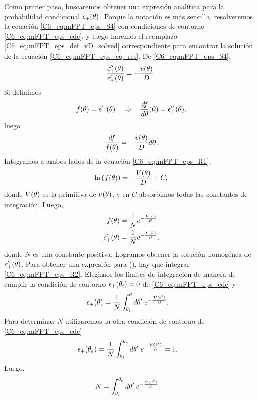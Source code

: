 \documentclass[./main.tex]{subfiles}
\begin{document}
Como primer paso, buscaremos obtener una expresión analítica para la probabilidad condicional $\epsilon_{+}(\theta)$. Porque la notación es más sencilla, resolveremos la ecuación \ref{C6_eq:mFPT_eps_S4} con condiciones de contorno \ref{C6_eq:mFPT_eps_cdc}, y luego haremos el reemplazo \ref{C6_eq:mFPT_eps_def_vD_solved} correspondiente para encontrar la solución de la ecuación \ref{C6_eq:mFPT_eps_eq_res}. De \ref{C6_eq:mFPT_eps_S4},
\begin{align}
     \frac{\epsilon_{+}''(\theta)}{\epsilon_{+}'(\theta)} = - \frac{v(\theta)}{D}.
\end{align}
Si definimos 
\begin{align*}
     f(\theta) = \epsilon_{+}'(\theta) \quad \Rightarrow \quad \frac{d f}{d\theta}(\theta) = \epsilon_{+}''(\theta),
\end{align*}
luego
\begin{align}
     \frac{df}{f(\theta)} = - \frac{v(\theta)}{D} d\theta.
     \label{C6_eq:mFPT_eps_R1}
\end{align}
Integramos a ambos lados de la ecuación \ref{C6_eq:mFPT_eps_R1}, 
\begin{align}
     \ln{(f(\ensuremath{\theta}))} = - \frac{V(\theta)}{D} + C,
\end{align}
donde $V(\theta)$ es la primitiva de $v(\theta)$, y en $C$ absorbimos todas las constantes de integración. Luego,
\begin{align}
     f(\theta) &= \frac{1}{N} e^{- \frac{V(\theta)}{D}} \nonumber \\
     \epsilon_{+}'(\theta) & =\frac{1}{N} e^{- \frac{V(\theta)}{D}}, 
     \label{C6_eq:mFPT_eps_R2}
\end{align}
donde $N$ es una constante positiva. Logramos obtener la solución homogénea de $\epsilon_{+}'(\theta)$. Para obtener una expresión para \epsplus(\xx), hay que integrar \ref{C6_eq:mFPT_eps_R2}. Elegimos los límites de integración de manera de cumplir la condición de contorno $\epsilon_{+}(\theta_i) = 0 $ de \ref{C6_eq:mFPT_eps_cdc} y
\begin{align}
     \epsilon_{+}(\theta) & = \frac{1}{N} \int_{\theta_i}^\theta d\theta'\; e^{- \frac{V(\theta')}{D}}  .  \label{C6_eq:mFPT_N_epsplus}
\end{align}
Para determinar $N$ utilizaremos la otra condición de contorno de \ref{C6_eq:mFPT_eps_cdc}
\begin{align}
     \epsilon_{+}(\theta_e) & = \frac{1}{N} \int_{\theta_i}^{\theta_e} d\theta'\; e^{- \frac{V(\theta')}{D}} = 1. 
\end{align}
Luego,
\begin{align}
      N &= \int_{\theta_i}^{\theta_e} d\theta'\; e^{- \frac{V(\theta')}{D}} .
\end{align}
\end{document}
